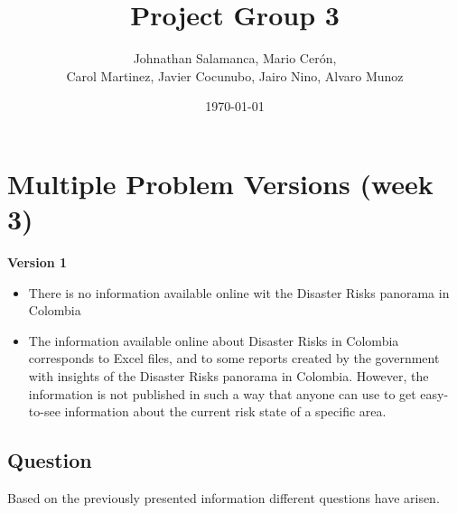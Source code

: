 \documentclass[11pt]{article}
\title{Project Group 3}
\author{ Johnathan Salamanca, Mario Cer\'{o}n, \\
Carol Martinez, Javier Cocunubo, Jairo Nino, Alvaro Munoz
 }
\date{\today}
\begin{document}
\maketitle







\section{Multiple Problem Versions (week 3)}
\label{sec:app}
\textbf{Version 1}

\begin{itemize}
\item{There is no information available online wit the Disaster Risks panorama in Colombia}
\item{The information available online about Disaster Risks in Colombia corresponds to Excel files, and to some reports created by the government with insights of the Disaster Risks panorama in Colombia. However, the information is not published in such a way that anyone can use to get easy-to-see information about the current risk state of a specific area. }
\end{itemize}


\subsection{Question}

Based on the previously presented information different questions have arisen.
\end{document}
